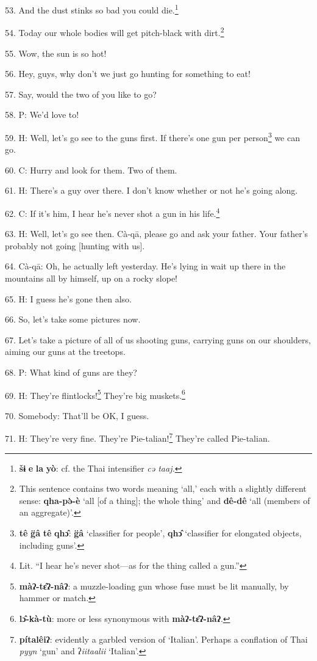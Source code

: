 53. And the dust stinks so bad you could die.\footnote{\textbf{šɨ} \textbf{e} \textbf{la} \textbf{yò}: cf. the Thai intensifier\textit{\textbf{ }}\textit{cə taaj.}}

54. Today our whole bodies will get pitch-black with dirt.\footnote{This sentence contains two words meaning `all,' each with a slightly different sense: \textbf{qha-pə̀-è} `all [of a thing]; the whole thing' and \textbf{dê-dê} `all (members of an aggregate)'.}

55. Wow, the sun is so hot!

56. Hey, guys, why don't we just go hunting for something to eat!

57. Say, would the two of you like to go?

58. P: We'd love to!

59. H: Well, let's go see to the guns first. If there's one gun per person\footnote{\textbf{tê} \textbf{g̈â} \textbf{tê} \textbf{qhɔ̂}: \textbf{g̈â} `classifier for people', \textbf{qhɔ̂} `classifier for elongated objects, including guns'.}
we can go.

60. C: Hurry and look for them. Two of them.

61. H: There's a guy over there. I don't know whether or not he's going along.

62. C: If it's him, I hear he's never shot a gun in his life.\footnote{Lit. ``I hear he's never shot---as for the thing called a gun.''}

63. H: Well, let's go see then. Cà-qā, please go and ask your father. Your father's
probably not going [hunting with us].

64. Cà-qā: Oh, he actually left yesterday. He's lying in wait up there in the
mountains all by himself, up on a rocky slope!

65. H: I guess he's gone then also.

66. So, let's take some pictures now.

67. Let's take a picture of all of us shooting guns, carrying guns on our shoulders,
aiming our guns at the treetops.

68. P: What kind of guns are they?

69. H: They're flintlocks!\footnote{\textbf{màʔ-tɛ̂ʔ-nâʔ}: a muzzle-loading gun whose fuse must be lit manually, by hammer or match.} They're big muskets.\footnote{\textbf{lɔ̂-kà-tù}: more or less synonymous with \textbf{màʔ-tɛ̂ʔ-nâʔ}.}

70. Somebody: That'll be OK, I guess.

71. H: They're very fine. They're Pie-talian!\footnote{\textbf{pítalêiʔ}: evidently a garbled version of `Italian'. Perhaps a conflation of Thai \textit{pyyn} `gun' and ʔ\textit{iitaalii} `Italian'.} They're called Pie-talian.

